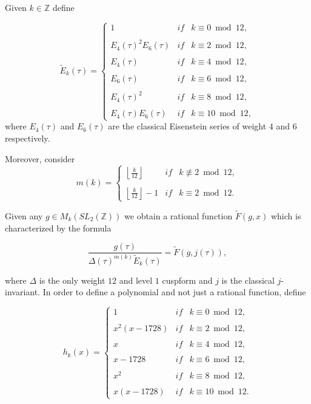 \documentclass[13pt]{amsart}
\theoremstyle{remark}
\numberwithin{theorem}{section} \numberwithin{equation}{section}
\begin{document}
Given $k \in \mathbb{Z}$ define 

\[ \tilde{E}_{k}(\tau)= \left\{ \begin{array}{lcc}
             1 &   if  & k \equiv 0 \bmod{12} ,\\
             \\  E_{4}(\tau)^2 E_{6}(\tau) &   if  & k \equiv 2 \bmod{12}, \\
             \\  E_{4}(\tau) &   if  & k \equiv 4 \bmod{12}, \\
             \\  E_{6}(\tau) &   if  & k \equiv 6 \bmod{12}, \\
             \\  E_{4}(\tau)^2 &   if  & k \equiv 8 \bmod{12} ,\\
             \\   E_{4}(\tau)E_{6}(\tau)  &   if  & k \equiv 10 \bmod{12} ,
             \end{array}
   \right.  \]
where $E_{4}(\tau)$ and $E_{6}(\tau)$ are the classical Eisenstein series of weight $4$ and $6$ respectively.

Moreover, consider
\[ m(k)= \left\{ \begin{array}{lcc}
             \left \lfloor{\frac{k}{12}}\right \rfloor  &   if  &  k \not\equiv 
2 \bmod{12}, \\
             \\ \left \lfloor{\frac{k}{12}}\right \rfloor -1 &  if  &  k \equiv 
2 \bmod{12}.
             \end{array}
   \right.  \]

Given any $g \in M_{k}(SL_{2}({\mathbb{Z}}))$ we obtain a rational function $\tilde{F}(g,x)$ which is characterized by the formula 

\[ \frac{g(\tau)}{\Delta(\tau)^{m(k)} \tilde{E}_{k}(\tau)}  = \tilde{F}(g,j(\tau))  ,\]

where $\Delta$ is the only weight $12$ and level $1$ cuspform and $j$ is the classical $j$-invariant. In order to define a polynomial and not just a rational function, define

\[ h_{k}(x)= \left\{ \begin{array}{lcc}
             1 &   if  & k \equiv 0 \bmod{12} ,\\
             \\  x^2 (x-1728) &   if  & k \equiv 2 \bmod{12}, \\
             \\  x &   if  & k \equiv 4 \bmod{12}, \\
             \\  x-1728 &   if  & k \equiv 6 \bmod{12}, \\
             \\  x^2 &   if  & k \equiv 8 \bmod{12} ,\\
             \\   x(x-1728)  &   if  & k \equiv 10 \bmod{12} .
             \end{array}
   \right.  \]
\end{document}
